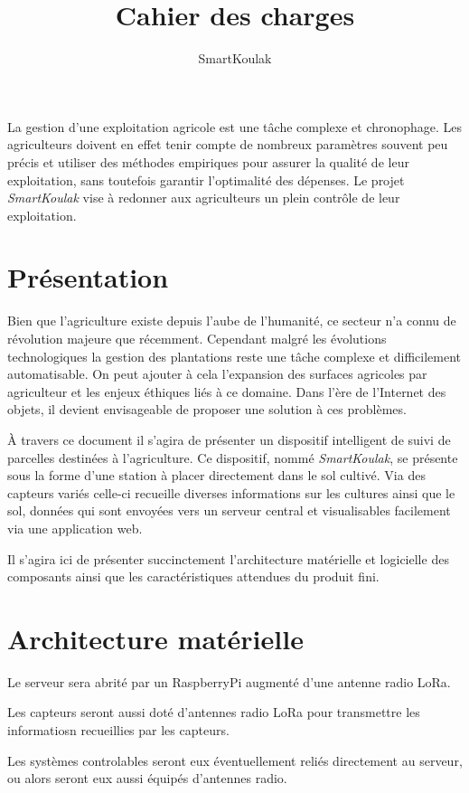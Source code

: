 \documentclass[11pt,a4paper]{article}
\author{SmartKoulak}
\title{Cahier des charges}
\begin{document}
\maketitle

La gestion d'une exploitation agricole est une tâche complexe et chronophage. Les agriculteurs doivent en effet tenir compte de nombreux paramètres souvent peu précis et utiliser des méthodes empiriques pour assurer la qualité de leur exploitation, sans toutefois garantir l'optimalité des dépenses. Le projet \textit{SmartKoulak} vise à redonner aux agriculteurs un plein contrôle de leur exploitation.


\section{Présentation}
Bien que l’agriculture existe depuis l’aube de l’humanité, ce secteur n’a connu de révolution majeure que récemment. Cependant malgré les évolutions technologiques la gestion des plantations reste une tâche complexe et difficilement automatisable. On peut ajouter à cela l'expansion des surfaces agricoles par agriculteur et les enjeux éthiques liés à ce domaine. Dans l’ère de l’Internet des objets, il devient envisageable de proposer une solution à ces problèmes.

À travers ce document il s’agira de présenter un dispositif intelligent de suivi de parcelles destinées à l’agriculture. Ce dispositif, nommé \textit{SmartKoulak}, se présente sous la forme d’une station à placer directement dans le sol cultivé. Via des capteurs variés celle-ci recueille diverses informations sur les cultures ainsi que le sol, données qui sont envoyées vers un serveur central et visualisables facilement via une application web.

Il s’agira ici de présenter succinctement l’architecture matérielle et logicielle des composants ainsi que les caractéristiques attendues du produit fini.

\section{Architecture matérielle}
Le serveur sera abrité par un RaspberryPi augmenté d'une antenne radio LoRa.

Les capteurs seront aussi doté d'antennes radio LoRa pour transmettre les informatiosn recueillies par les capteurs.

Les systèmes controlables seront eux éventuellement reliés directement au serveur, ou alors seront eux aussi équipés d'antennes radio.
\end{document}
